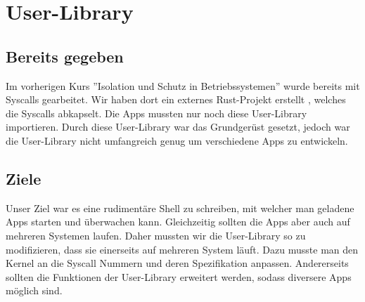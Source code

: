 \section{User-Library}

\subsection{Bereits gegeben}
    Im vorherigen Kurs ''Isolation und Schutz in Betriebssystemen'' wurde bereits mit Syscalls gearbeitet. Wir haben dort ein externes Rust-Projekt erstellt \cite{usrlib-repo}, welches die Syscalls abkapselt. Die Apps mussten nur noch diese User-Library importieren. \newline
    Durch diese User-Library war das Grundgerüst gesetzt, jedoch war die User-Library nicht umfangreich genug um verschiedene Apps zu entwickeln.
    

\subsection{Ziele}
    Unser Ziel war es eine rudimentäre Shell zu schreiben, mit welcher man geladene Apps starten und überwachen kann. Gleichzeitig sollten die Apps aber auch auf mehreren Systemen laufen. Daher mussten wir die User-Library so zu modifizieren, dass sie einerseits auf mehreren System läuft. Dazu musste man den Kernel an die Syscall Nummern und deren Spezifikation anpassen. Andererseits sollten die Funktionen der User-Library erweitert werden, sodass diversere Apps möglich sind.

